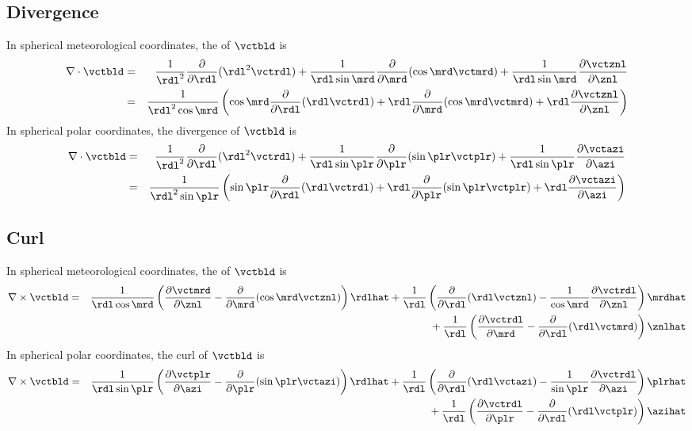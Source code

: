 \documentclass[12pt,twoside]{book}
\begin{document}
\subsection[Divergence]{Divergence}\label{sxn:dvr_sph}
In spherical meteorological coordinates, the  of $\vctbld$ is 
\begin{eqnarray}
\nabla \cdot \vctbld & = & 
\frac{1}{\rdl^{2}} \frac{\partial}{\partial \rdl } ( \rdl^{2} \vctrdl ) + 
\frac{1}{\rdl \sin \mrd} \frac{\partial}{\partial \mrd} ( \cos \mrd \vctmrd ) + 
\frac{1}{\rdl \sin \mrd} \frac{\partial \vctznl}{\partial \znl} 
\nonumber \\
& = &
\frac{1}{\rdl^{2} \cos \mrd} \left(
\cos \mrd \frac{\partial}{\partial \rdl } ( \rdl \vctrdl ) + 
\rdl \frac{\partial}{\partial \mrd} ( \cos \mrd \vctmrd ) + 
\rdl \frac{\partial \vctznl}{\partial \znl} 
\right)
\label{eqn:dvr_sph_mtr}
\end{eqnarray}
In spherical polar coordinates, the divergence of $\vctbld$ is 
\begin{eqnarray}
\nabla \cdot \vctbld & = &
\frac{1}{\rdl^{2}} \frac{\partial}{\partial \rdl } ( \rdl^{2} \vctrdl ) + 
\frac{1}{\rdl \sin \plr} \frac{\partial}{\partial \plr} ( \sin \plr \vctplr ) + 
\frac{1}{\rdl \sin \plr} \frac{\partial \vctazi}{\partial \azi} 
\nonumber \\
& = &
\frac{1}{\rdl^{2} \sin \plr} \left(
\sin \plr \frac{\partial}{\partial \rdl } ( \rdl \vctrdl ) + 
\rdl \frac{\partial}{\partial \plr} ( \sin \plr \vctplr ) + 
\rdl \frac{\partial \vctazi}{\partial \azi} 
\right)
\label{eqn:dvr_sph_plr}
\end{eqnarray}

\subsection[Curl]{Curl}\label{sxn:crl_sph}
In spherical meteorological coordinates, the  of $\vctbld$ is 
\begin{eqnarray}
\nabla \times \vctbld & = & 
\frac{1}{\rdl \cos \mrd} \left( 
\frac{\partial \vctmrd}{\partial \znl} - 
\frac{\partial}{\partial \mrd} ( \cos \mrd \vctznl ) 
\right) \rdlhat +
\frac{1}{\rdl} \left( 
\frac{\partial}{\partial \rdl} ( \rdl \vctznl ) - 
\frac{1}{\cos \mrd} \frac{\partial \vctrdl}{\partial \znl} 
\right) \mrdhat \nonumber \\
& &  {} + \frac{1}{\rdl} \left( 
\frac{\partial \vctrdl}{\partial \mrd} - 
\frac{\partial}{\partial \rdl} ( \rdl \vctmrd )
\right) \znlhat
\label{eqn:crl_sph_mtr}
\end{eqnarray}
In spherical polar coordinates, the curl of $\vctbld$ is 
\begin{eqnarray}
\nabla \times \vctbld & = & 
\frac{1}{\rdl \sin \plr} \left( 
\frac{\partial \vctplr}{\partial \azi} - 
\frac{\partial}{\partial \plr} ( \sin \plr \vctazi ) 
\right) \rdlhat +
\frac{1}{\rdl} \left( 
\frac{\partial}{\partial \rdl} ( \rdl \vctazi ) - 
\frac{1}{\sin \plr} \frac{\partial \vctrdl}{\partial \azi} 
\right) \plrhat \nonumber \\
& & {} + \frac{1}{\rdl} \left( 
\frac{\partial \vctrdl}{\partial \plr} - 
\frac{\partial}{\partial \rdl} ( \rdl \vctplr )
\right) \azihat
\label{eqn:crl_sph_plr}
\end{eqnarray}
\end{document}
